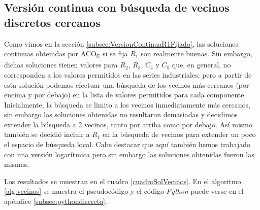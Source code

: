 \documentclass{llncs}
\begin{document}
	\subsection{Versión continua con búsqueda de vecinos discretos cercanos}
	\label{subsec:VersionDiscreta}
	Como vimos en la sección \ref{subsec:VersionContinuaR1Fijado}, las soluciones continuas obtenidas por ACO\textsubscript{$\mathbb{R}$} 
	si se fija $R_1$ son realmente buenas. Sin embargo, dichas soluciones  tienen valores para $R_2$, $R_3$, $C_4$ y $C_5$ que, 
	en general, no corresponden a los valores permitidos en las series industriales; pero a partir de esta solución podemos efectuar 
	una búsqueda de los vecinos más cercanos (por encima y por debajo) en la lista de valores permitidos para cada 
	componente. Inicialmente, la búsqueda se limito a los vecinos inmediatamente más cercanos, sin embargo las soluciones obtenidas
	no resultaron demasiadas y decidimos extender la búsqueda a 2 vecinos, tanto por arriba como por debajo. Así mismo también
	se decidió incluir a $R_1$ en la búsqueda de vecinos para extender un poco el espacio de búsqueda local. Cabe destacar que aquí
	también hemos trabajado con una versión logarítmica pero sin embargo las soluciones obtenidas fueron las mismas.
	
	Los resultados se muestran en el cuadro \ref{cuadroSolVecinos}. En el algoritmo \ref{alg:vecinos} se muestra el pseudocódigo y el 
	código \textit{Python} puede verse en el apéndice \ref{subsec:pythondiscreto}.
	
\end{document}
